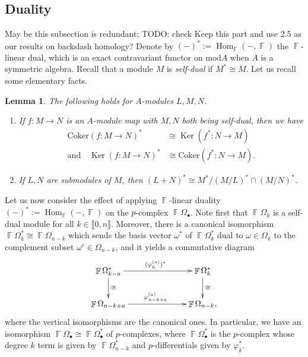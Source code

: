 \documentclass[a4paper]{amsart}
\numberwithin{equation}{subsection}
\newtheorem{lemma}[theorem]{Lemma}
\theoremstyle{definition}
\DeclareMathOperator{\F}{\mathbb{F}}
\DeclareMathOperator{\Z}{\mathbb{Z}}
\DeclareMathOperator{\Hom}{\mathrm{Hom}}
\newcommand{\interval}[1]{\llbracket #1 \rrbracket}
\newcommand{\comm}[1]{{\color{red}#1}}
\DeclareMathOperator{\Ker}{\mathrm{Ker}}
\numberwithin{equation}{subsection}
\begin{document}
\subsection{Duality}\label{subsec:duality}
\comm{May be this subsection is redundant; TODO: check}
\comm{Keep this part and use 2.5 as our results on backslash homology?}
Denote by $(-)^*:=\Hom_{\F}(-,\F)$ the $\F$-linear dual, which is an exact contravariant functor on $\mathrm{mod} A$ when $A$ is a symmetric algebra.
Recall that a module $M$ is \emph{self-dual} if $M^*\cong M$.
Let us recall some elementary facts.
\begin{lemma}\label{lem-duality}
The following holds for $A$-modules $L, M, N$.
\begin{enumerate}[(1)]
\item If $f:M\to N$ is an $A$-module map with $M, N$ both being self-dual, then we have
\begin{align*}
\mathrm{Coker}(f:M\to N)^* &\cong \Ker(f^*:N\to M)\\
\text{and}\quad \Ker(f:M\to N)^* &\cong \mathrm{Coker}(f^*:N\to M).
\end{align*}
\item If $L, N$ are submodules of $M$, then $(L+N)^*\cong M^*/(M/L)^*\cap (M/N)^*$.
\end{enumerate}
\end{lemma}

Let us now consider the effect of applying $\F$-linear duality $(-)^*:=\Hom_{\F}(-,\F)$ on the $p$-complex $\F\Omega_\bullet$.
Note first that $\F\Omega_k$ is a self-dual module for all $k\in\interval{0,n}$.
Moreover, there is a canonical isomorphism $\F\Omega_k^*\cong \F\Omega_{n-k}$ which sends the basis vector $\omega^*$ of $\F\Omega_k^*$ dual to $\omega\in \Omega_k$ to the complement subset $\omega^c\in \Omega_{n-k}$, and it yields a commutative diagram
\begin{equation}\label{eq:dualcomm}
\xymatrix@C=70pt{
\F\Omega_{k-a}^* \ar[d]^{\cong}\ar[r]^{(\varphi_k^{(a)})^*} & \F\Omega_k^*\ar[d]^{\cong}\\
\F\Omega_{n-k+a} \ar[r]^{\varphi_{n-k+a}^{(a)}} & \F\Omega_{n-k},
}
\end{equation}
where the vertical isomorphisms are the canonical ones.
In particular, we have an isomorphism $\F\Omega_\bullet \cong \F\Omega_\bullet^*$ of $p$-complexes, where $\F\Omega_\bullet^*$ is the $p$-complex whose degree $k$ term is given by $\F\Omega_{n-k}^*$ and $p$-differentials given by $\varphi_k^*$.
\end{document}
